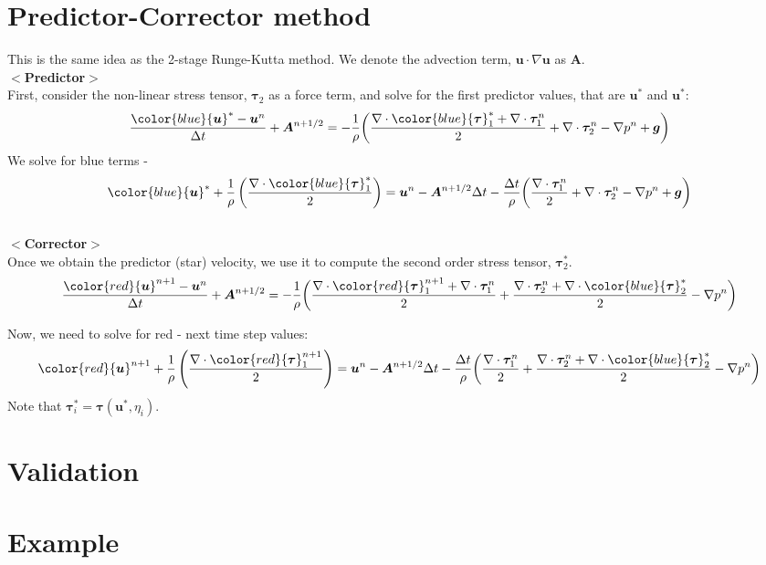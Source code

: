 \section{Predictor-Corrector method}
This is the same idea as the 2-stage Runge-Kutta method. We denote the advection term, ${\bm u} \cdot \nabla {\bm u}$ as ${\bm A}$. 
\\
$<${\bf Predictor}$>$
\\
First, consider the non-linear stress tensor, ${\bm \tau_2}$ as a force term, and solve for the first predictor values, that are ${\bm u}^*$ and ${\bm u}^*$:
\[
\frac{{\color{blue}{\bm u}^*} - {\bm u}^n}{\Delta t} 
+  {\bm A}^{n+1/2} 
=- \frac{1}{\rho}  \biggl(
\frac{\nabla \cdot {\color{blue}{\bm \tau}_1^*} + \nabla \cdot{\bm \tau}_1^n}{2} 
+ \nabla \cdot {\bm \tau}_2^n 
- \nabla p^n
+{\bm g}
\biggr)
\]
We solve for blue terms - 
\[
{\color{blue}{\bm u}^*} +
\frac{1}{\rho} 
\left( 
\frac{\nabla \cdot {\color{blue}{\bm \tau}_1^*}}{2}
\right)
=
{\bm u}^n
- {\bm A}^{n+1/2} \Delta t
- \frac{\Delta t}{\rho} \biggl(
\frac{ \nabla \cdot{\bm \tau}_1^n}{2} 
+ \nabla \cdot {\bm \tau}_2^n 
- \nabla p^n
+{\bm g}
\biggr)
\]
\\
$<${\bf Corrector}$>$
\\
Once we obtain the predictor (star) velocity, we use it to compute the second order stress tensor, ${\bm \tau}_2^*$.
\[
\frac{{\color{red}{\bm u}^{n+1}} - {\bm u}^n}{\Delta t} 
+  {\bm A}^{n+1/2} 
=- \frac{1}{\rho}  \biggl(
\frac{\nabla \cdot {\color{red}{\bm \tau}_1^{n+1}} + \nabla \cdot{\bm \tau}_1^n}{2} 
+ \frac{\nabla \cdot {\bm \tau}_2^{n} + \nabla \cdot {\color{blue}{\bm \tau}_2^*}}{2} 
- \nabla p^n
\biggr)
\]

Now, we need to solve for red - next time step values:
\[
{\color{red}{\bm u}^{n+1}} 
+\frac{1}{\rho} 
\left(
\frac{\nabla \cdot {\color{red}{\bm \tau}_1^{n+1}}}{2}
\right)
=
{\bm u}^n 
 -{\bm A}^{n+1/2} \Delta t
- \frac{\Delta t}{\rho}  \biggl(
\frac{ \nabla \cdot{\bm \tau}_1^n}{2} 
+ \frac{\nabla \cdot {\bm \tau}_2^{n} + \nabla \cdot {\color{blue}{\bm \tau}_2^*}}{2} 
- \nabla p^n
\biggr)
\]
Note that ${\bm \tau}_i^* = {\bm \tau}({\bm u}^*, \eta_i)$.
\section{Validation}
\section{Example}